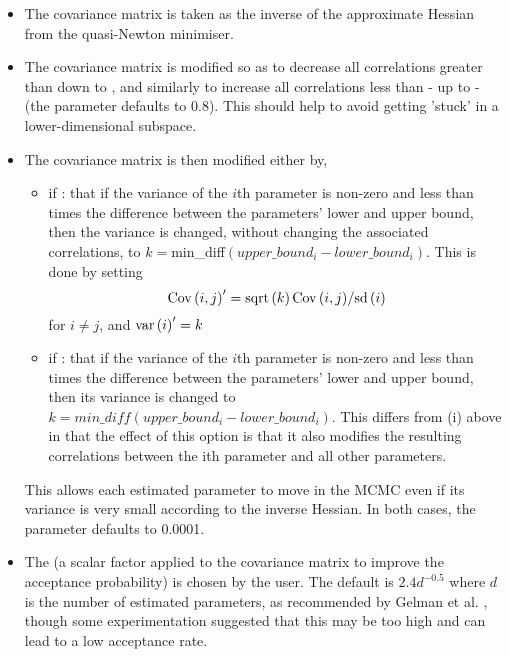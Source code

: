 \begin{itemize}
\item The covariance matrix is taken as the inverse of the approximate Hessian from the quasi-Newton minimiser.

\item The covariance matrix is modified so as to decrease all correlations greater than  down to , and similarly to increase all correlations less than  - up to - (the  parameter defaults to 0.8). This should help to avoid getting 'stuck' in a lower-dimensional subspace.

\item The covariance matrix is then modified either by,

\begin{itemize}
\item if : that if the variance of the $i$th parameter is non-zero and less than  times the difference between the parameters' lower and upper bound, then the variance is changed, without changing the associated correlations, to $k=$min\_diff$(upper\_bound_i-lower\_bound_i)$. This is done by setting \[
{\mathop{\rm Cov}\nolimits} \left( {i,j} \right)^\prime   = {{{\mathop{\rm sqrt}\nolimits} \left( k \right){\mathop{\rm Cov}\nolimits} \left( {i,j} \right)} \mathord{\left/
{\vphantom {{{\mathop{\rm sqrt}\nolimits} \left( k \right){\mathop{\rm Cov}\nolimits} \left( {i,j} \right)} {{\mathop{\rm sd}\nolimits} \left( i \right)}}} \right.
\kern-\nulldelimiterspace} {{\mathop{\rm sd}\nolimits} \left( i \right)}}
\]
for $i \ne j$, and ${\mathop{\rm var}} \left( i \right)^\prime   = k$

\item if : that if the variance of the $i$th parameter is non-zero and less than  times the difference between the parameters' lower and upper bound, then its variance is changed to $k=min\_diff(upper\_bound_i-lower\_bound_i)$. This differs from (i) above in that the effect of this option is that it also modifies the resulting correlations between the ith parameter and all other parameters.
\end{itemize}

This allows each estimated parameter to move in the MCMC even if its variance is very small according to the inverse Hessian. In both cases, the  parameter defaults to 0.0001.

\item The  (a scalar factor applied to the covariance matrix to improve the acceptance probability) is chosen by the user. The default is $2.4d^{-0.5}$ where $d$ is the number of estimated parameters, as recommended by Gelman et al. \citep{823}, though some experimentation suggested that this may be too high and can lead to a low acceptance rate. 
\end{itemize}

